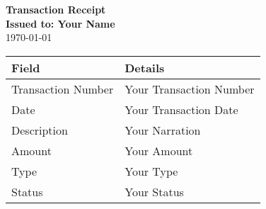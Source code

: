 \documentclass[a4paper,12pt]{article}
\begin{document}
\begin{center}
    \textbf{\Large Transaction Receipt} \\
    \vspace{0.2cm}
    \textbf{Issued to: Your Name} \\
    \vspace{0.1cm}
    \small \today
\end{center}

\vspace{0.5cm}

\begin{tabular}{ll}
    \toprule
    \rowcolor{headerblue!20}
    \textbf{Field} & \textbf{Details} \\
    \midrule
    Transaction Number & Your Transaction Number \\
    Date & Your Transaction Date \\
    Description & Your Narration \\
    Amount & Your Amount \\
    Type & Your Type \\
    Status & Your Status \\
    \bottomrule
\end{tabular}
\end{document}
